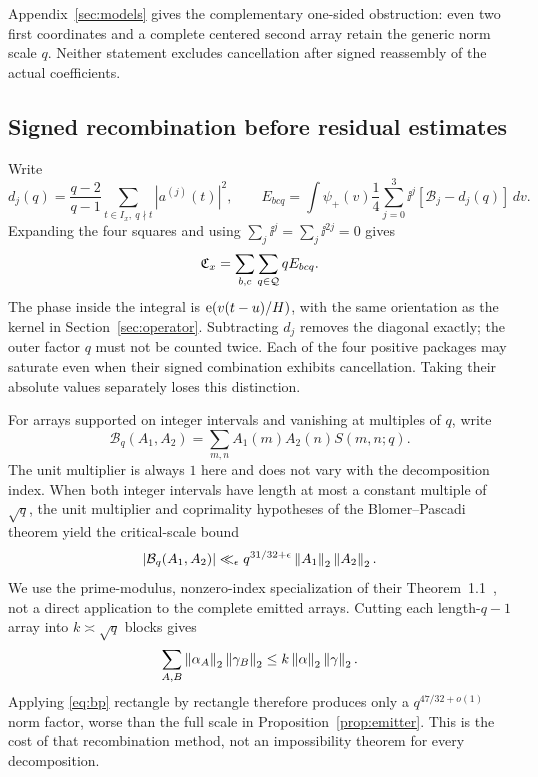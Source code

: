 Appendix~\ref{sec:models} gives the complementary one-sided obstruction: even two first coordinates and a complete centered second array retain the generic norm scale $q$. Neither statement excludes cancellation after signed reassembly of the actual coefficients.

\subsection{Signed recombination before residual estimates}
Write
\[
d_j(q)=\frac{q-2}{q-1}\sum_{t\in I_x,\ q\nmid t}|a^{(j)}(t)|^2,\qquad
E_{bcq}=\int\psi_+(v)\frac14\sum_{j=0}^3\ii^j[\mathcal B_j-d_j(q)]\,dv.
\]
Expanding the four squares and using $\sum_j\ii^j=\sum_j\ii^{2j}=0$ gives
\begin{equation}
\mathfrak C_x=\sum_{b,c}\sum_{q\in\mathcal Q}qE_{bcq}.\label{eq:polarreturn}
\end{equation}
The phase inside the integral is $\mathrm e(v(t-u)/H)$, with the same orientation as the kernel in Section~\ref{sec:operator}.
Subtracting $d_j$ removes the diagonal exactly; the outer factor $q$ must not be counted twice. Each of the four positive packages may saturate even when their signed combination exhibits cancellation. Taking their absolute values separately loses this distinction.

For arrays supported on integer intervals and vanishing at multiples of $q$, write
\[
\mathcal B_q(A_1,A_2)=\sum_{m,n}A_1(m)A_2(n)S(m,n;q).
\]
The unit multiplier is always $1$ here and does not vary with the decomposition index.
When both integer intervals have length at most a constant multiple of $\sqrt q$, the unit multiplier and coprimality hypotheses of the Blomer--Pascadi theorem yield the critical-scale bound
\begin{equation}
|\mathcal B_q(A_1,A_2)|\ll_\epsilon q^{31/32+\epsilon}
\left\|A_1\right\|_2\left\|A_2\right\|_2.\label{eq:bp}
\end{equation}
We use the prime-modulus, nonzero-index specialization of their Theorem~1.1~\cite{blomer2026}, not a direct application to the complete emitted arrays.
Cutting each length-$q-1$ array into $k\asymp\sqrt q$ blocks gives
\[
\sum_{A,B}\left\|\alpha_A\right\|_2\left\|\gamma_B\right\|_2\le k\left\|\alpha\right\|_2\left\|\gamma\right\|_2.
\]
Applying \eqref{eq:bp} rectangle by rectangle therefore produces only a $q^{47/32+o(1)}$ norm factor, worse than the full scale in Proposition~\ref{prop:emitter}. This is the cost of that recombination method, not an impossibility theorem for every decomposition.

